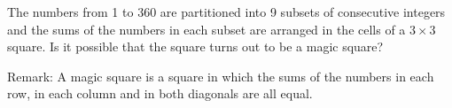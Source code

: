 The numbers from 1 to 360 are partitioned into 9 subsets of consecutive integers and the sums of the numbers in each subset are arranged in the cells of a $3 \times 3$ square.  Is it possible that the square turns out to be a magic square?

Remark: A magic square is a square in which the sums of the numbers in each row, in each column and in both diagonals are all equal.